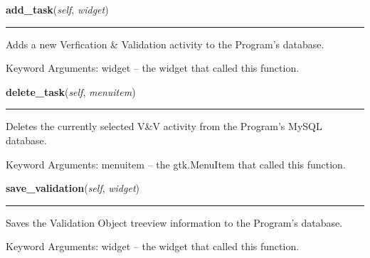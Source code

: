 \hspace{.8\funcindent}\begin{boxedminipage}{\funcwidth}

    \raggedright \textbf{add\_task}(\textit{self}, \textit{widget})

    \vspace{-1.5ex}

    \rule{\textwidth}{0.5\fboxrule}
\setlength{\parskip}{2ex}
    Adds a new Verfication \& Validation activity to the Program's 
    database.

    Keyword Arguments: widget -- the widget that called this function.

\setlength{\parskip}{1ex}
    \end{boxedminipage}

    \label{reliafree:validation:Validation:delete_task}

    \vspace{0.5ex}

\hspace{.8\funcindent}\begin{boxedminipage}{\funcwidth}

    \raggedright \textbf{delete\_task}(\textit{self}, \textit{menuitem})

    \vspace{-1.5ex}

    \rule{\textwidth}{0.5\fboxrule}
\setlength{\parskip}{2ex}
    Deletes the currently selected V\&V activity from the Program's MySQL 
    database.

    Keyword Arguments: menuitem -- the gtk.MenuItem that called this 
    function.

\setlength{\parskip}{1ex}
    \end{boxedminipage}

    \label{reliafree:validation:Validation:save_validation}

    \vspace{0.5ex}

\hspace{.8\funcindent}\begin{boxedminipage}{\funcwidth}

    \raggedright \textbf{save\_validation}(\textit{self}, \textit{widget})

    \vspace{-1.5ex}

    \rule{\textwidth}{0.5\fboxrule}
\setlength{\parskip}{2ex}
    Saves the Validation Object treeview information to the Program's 
    database.

    Keyword Arguments: widget -- the widget that called this function.

\setlength{\parskip}{1ex}
    \end{boxedminipage}

